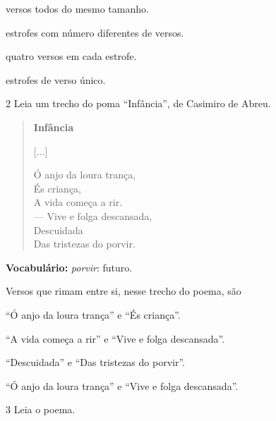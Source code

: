 \begin{escolha}[itemsep=-5pt]
\item versos todos do mesmo tamanho.

\item estrofes com número diferentes de versos.

\item quatro versos em cada estrofe.

\item estrofes de verso único.
\end{escolha}

\num{2} Leia um trecho do poma ``Infância'', de Casimiro de Abreu.

\begin{myquote}
\begin{verse}
\textbf{Infância}

{[}...{]}

Ó anjo da loura trança,\\
És criança,\\
A vida começa a rir.\\
--- Vive e folga descansada,\\
Descuidada\\
Das tristezas do porvir.
\end{verse}


\begin{small}
\textbf{Vocabulário:} \textit{porvir}: futuro.
\end{small}
\end{myquote}

Versos que rimam entre si, nesse trecho do poema, são

\begin{escolha}[itemsep=-5pt]
\item ``Ó anjo da loura trança'' e ``És criança''.

\item ``A vida começa a rir'' e ``Vive e folga descansada''.

\item ``Descuidada'' e ``Das tristezas do porvir''.

\item ``Ó anjo da loura trança'' e ``Vive e folga descansada''.
\end{escolha}

\num{3} Leia o poema.

